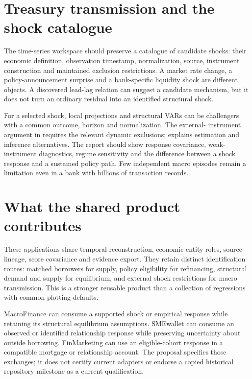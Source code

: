 \section{Treasury transmission and the shock catalogue}
The time-series workspace should preserve a catalogue of candidate shocks:
their economic definition, observation timestamp, normalization, source,
instrument construction and maintained exclusion restrictions. A market
rate change, a policy-announcement surprise and a bank-specific liquidity
shock are different objects. A discovered lead-lag relation can suggest
a candidate mechanism, but it does not turn an ordinary residual into an
identified structural shock.

For a selected shock, local projections and structural VARs can be
challengers with a common outcome, horizon and normalization. The external-
instrument argument in \citet{stock2018} requires the relevant dynamic
exclusions; \citet{jorda2024} explains estimation and inference alternatives.
The report should show response covariance, weak-instrument diagnostics,
regime sensitivity and the difference between a shock response and a
sustained policy path. Few independent macro episodes remain a limitation
even in a bank with billions of transaction records.

\section{What the shared product contributes}
These applications share temporal reconstruction, economic entity roles,
source lineage, score covariance and evidence export. They retain distinct
identification routes: matched borrowers for supply, policy eligibility
for refinancing, structural demand and supply for equilibrium, and external
shock restrictions for macro transmission. This is a stronger reusable
product than a collection of regressions with common plotting defaults.

MacroFinance can consume a supported shock or empirical response while
retaining its structural equilibrium assumptions. SMEwallet can consume
an observed or identified relationship response while preserving uncertainty
about outside borrowing. FinMarketing can use an eligible-cohort response
in a compatible mortgage or relationship account. The proposal specifies
those exchanges; it does not certify current adapters or endorse a copied
historical repository milestone as a current qualification.
